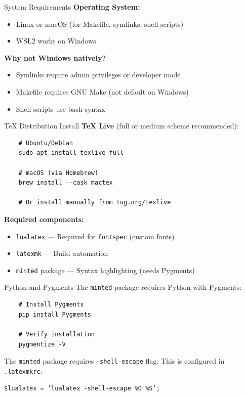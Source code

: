 \begin{frame}{System Requirements}
  \textbf{Operating System:}
  \begin{itemize}
    \item Linux or macOS (for Makefile, symlinks, shell scripts)
    \item WSL2 works on Windows
  \end{itemize}

  \vspace{0.5cm}
  \textbf{Why not Windows natively?}
  \begin{itemize}
    \item Symlinks require admin privileges or developer mode
    \item Makefile requires GNU Make (not default on Windows)
    \item Shell scripts use bash syntax
  \end{itemize}
\end{frame}

\begin{frame}[fragile]{TeX Distribution}
  Install \textbf{TeX Live} (full or medium scheme recommended):
  \begin{verbatim}
    # Ubuntu/Debian
    sudo apt install texlive-full

    # macOS (via Homebrew)
    brew install --cask mactex

    # Or install manually from tug.org/texlive
  \end{verbatim}

  \vspace{0.3cm}
  \textbf{Required components:}
  \begin{itemize}
    \item \verb|lualatex| --- Required for \verb|fontspec| (custom fonts)
    \item \verb|latexmk| --- Build automation
    \item \verb|minted| package --- Syntax highlighting (needs Pygments)
  \end{itemize}
\end{frame}

\begin{frame}[fragile]{Python and Pygments}
  The \verb|minted| package requires Python with Pygments:
  \begin{verbatim}
    # Install Pygments
    pip install Pygments

    # Verify installation
    pygmentize -V
  \end{verbatim}

  \vspace{0.5cm}
  \begin{sqt:result}
    The \texttt{minted} package requires \texttt{-shell-escape} flag.
    This is configured in \texttt{.latexmkrc}:
    \begin{center}
      \texttt{\$lualatex = 'lualatex -shell-escape \%O \%S';}
    \end{center}
  \end{sqt:result}
\end{frame}

